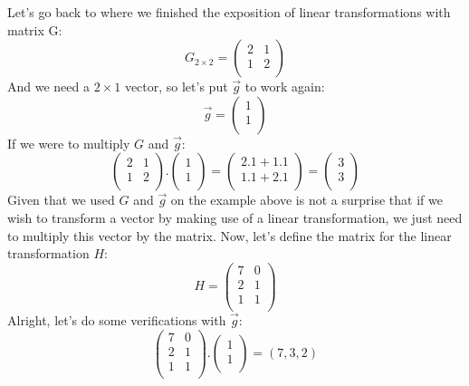 \documentclass[600paper, 11pt,twoside,openany]{kdp}
\begin{document}
\indent Let’s go back to where we finished the exposition of linear transformations with matrix G:
\[ G_{2\times2} = 
\begin{pmatrix}
2 & 1 \\
1 & 2 \\
\end{pmatrix}
\]
\indent And we need a $2\times1$ vector, so let’s put $\overrightarrow{g}$ to work again:
\[\overrightarrow{g} = 
\begin{pmatrix}
1\\
1\\
\end{pmatrix}
\]
\indent If we were to multiply $G$ and $\overrightarrow{g}$:
\[
\begin{pmatrix}
2 & 1 \\
1 & 2 \\
\end{pmatrix} .\begin{pmatrix}
1\\
1\\
\end{pmatrix} = \begin{pmatrix}
2.1 + 1.1 \\
1.1 + 2.1 \\
\end{pmatrix}  =  \begin{pmatrix}
3 \\
3 \\
\end{pmatrix}
\]
\indent Given that we used $G$ and $\overrightarrow{g}$ on the example above is not a surprise that if we wish to transform a vector by making use of a linear transformation, we just need to multiply this vector by the matrix.
Now, let’s define the matrix for the linear transformation $H$:
\[H = \begin{pmatrix}
7 & 0 \\
2 & 1 \\
1 & 1 \\
\end{pmatrix}
\]
\indent Alright, let’s do some verifications with $\overrightarrow{g}$:
\[ \begin{pmatrix}
7 & 0 \\
2 & 1 \\
1 & 1 \\
\end{pmatrix}.\begin{pmatrix}
1 \\
1 \\
\end{pmatrix}  = (7,3,2)\]
\end{document}
